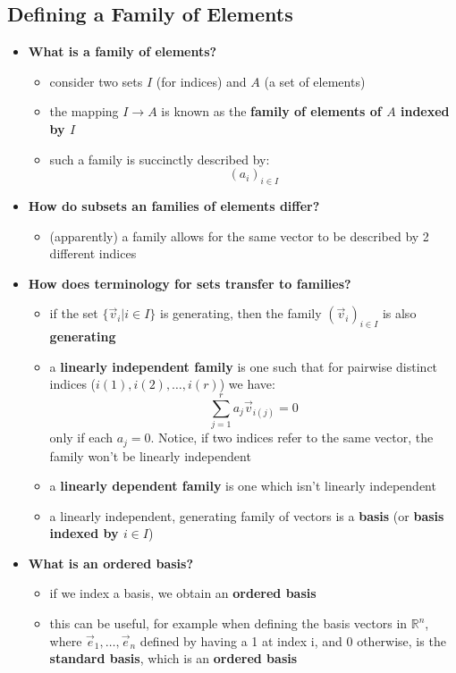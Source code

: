 \documentclass{exam}
\begin{document}
\subsection{Defining a Family of Elements}

\begin{itemize}
    \item \textbf{What is a family of elements?}
    \begin{itemize}
        \item consider two sets $I$ (for indices) and $A$ (a set of elements)
        \item the mapping $I \to A$ is known as the \textbf{family of elements of $A$ indexed by $I$}
        \item such a family is succinctly described by:
        \[
        (a_i)_{i \in I}
        \]
    \end{itemize}
    \item \textbf{How do subsets an families of elements differ?}
    \begin{itemize}
        \item (apparently) a family allows for the same vector to be described by 2 different indices
    \end{itemize}
    \item \textbf{How does terminology for sets transfer to families?}
    \begin{itemize}
        \item if the set $\{\vec{v}_i | i \in I\}$ is generating, then the family $(\vec{v}_i)_{i \in I}$ is also \textbf{generating}
        \item a \textbf{linearly independent family} is one such that for pairwise distinct indices ($i(1), i(2), \ldots, i(r)$) we have:
        \[
        \sum_{j = 1}^r a_j\vec{v}_{i(j)} = 0
        \]
        only if each $a_j = 0$. Notice, if two indices refer to the same vector, the family won't be linearly independent
        \item a \textbf{linearly dependent family} is one which isn't linearly independent
        \item a linearly independent, generating family of vectors is a \textbf{basis} (or \textbf{basis indexed by $i \in I$})
    \end{itemize}
        \item \textbf{What is an ordered basis?}
    \begin{itemize}
        \item if we index a basis, we obtain an \textbf{ordered basis}
        \item this can be useful, for example when defining the basis vectors in $\mathbb{R}^n$, where $\vec{e}_1, \ldots, \vec{e}_n$ defined by having a 1 at index i, and 0 otherwise, is the \textbf{standard basis}, which is an \textbf{ordered basis}
    \end{itemize}
\end{itemize}
\end{document}
